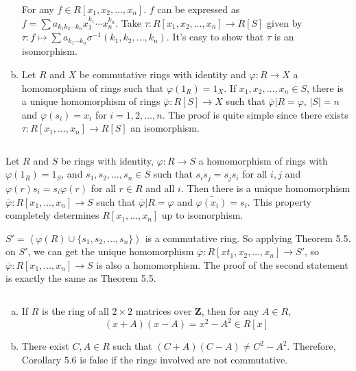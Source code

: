 \begin{answer}
\begin{enumerate}[(a)]
        For any $f\in R[x_{1},x_{2},\dots,x_{n}]$. $f$ can be expressed as \\$f=\sum a_{k_{1}k_{2}\cdots k_{n}}x_{1}^{k_{1}}\cdots x_{n}^{k_{n}}$. Take $\tau:R[x_{1},x_{2},\dots,x_{n}]\to R[S]$ given by $\tau:f\mapsto \sum a_{k_{1}\cdots k_{n}}\sigma^{-1}(k_{1},k_{2},\dots,k_{n})$. It's easy to show that $\tau$ is an isomorphism.
        \item Let $R$ and $X$ be commutative rings with identity and $\varphi:R\to X$ a homomorphism of rings such that $\varphi(1_{R})=1_{X}$. If $x_{1},x_{2},\dots,x_{n}\in S$, there is a unique homomorphism of rings $\bar{\varphi}:R[S]\to X$ such that $\bar{\varphi}|R=\varphi$, $\left| S \right| =n$ and $\varphi(s_{i})=x_{i}$ for $i=1,2,\dots,n$. The proof is quite simple since there exists $\tau:R[x_{1},\dots,x_{n}]\to R[S]$ an isomorphism.
    \end{enumerate}
\end{answer}

$$ $$

\begin{ex}
    Let $R$ and $S$ be rings with identity, $\varphi:R\to S$ a homomorphism of rings with $\varphi(1_{R})=1_{S}$, and $s_{1},s_{2},\dots,s_{n}\in S$ such that $s_{i}s_{j}=s_{j}s_{i}$ for all $i,j$ and $\varphi(r)s_{i}=s_{i}\varphi(r)$ for all $r\in R$ and all $i$. Then there is a unique homomorphism $\bar{\varphi}:R[x_{1},\dots,x_{n}]\to S$ such that $\bar{\varphi}|R=\varphi$ and $\bar{\varphi(x_{i})}=s_{i}$. This property completely determines $R[x_{1},\dots,x_{n}]$ up to isomorphism.
\end{ex}

\begin{answer}
    $S'=\left\langle\varphi(R)\cup\{s_{1},s_{2},\dots,s_{n}\}\right\rangle$ is a commutative ring. So applying Theorem 5.5. on $S'$, we can get the unique homomorphism $\bar{\varphi}:R[xt_{1},x_{2},\dots,x_{n}]\to S'$, so $\bar{\varphi}:R[x_{1},\dots,x_{n}]\to S$ is also a homomorphism. The proof of the second statement is exactly the same as Theorem 5.5.
\end{answer}

$$ $$

\begin{ex}
    \begin{enumerate}[(a)]
        \item If $R$ is the ring of all $2\times 2$ matrices over $\mathbf{Z}$, then for any $A\in R$,\[(x+A)(x-A)=x^{2}-A^{2}\in R[x]\]
        \item There exist $C,A\in R$ such that $(C+A)(C-A)\neq C^{2}-A^{2}$. Therefore, Corollary 5.6 is false if the rings involved are not commutative.
    \end{enumerate}
\end{ex}

